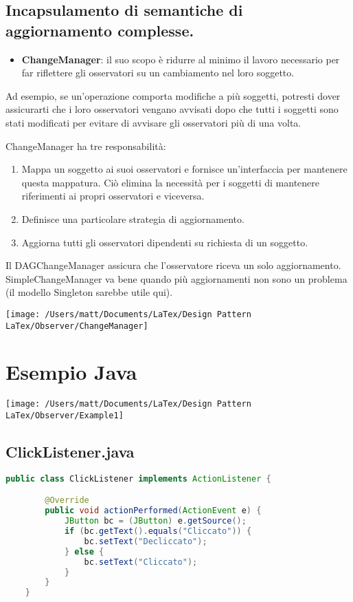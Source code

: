 \subsection{Incapsulamento di semantiche di aggiornamento complesse.}

\begin{itemize}
    \item \textbf{ChangeManager}: il suo scopo è ridurre al minimo il lavoro necessario per far riflettere gli osservatori su un cambiamento nel loro soggetto.
\end{itemize}

Ad esempio, se un'operazione comporta modifiche a più soggetti, potresti dover assicurarti che i loro osservatori vengano avvisati dopo che tutti i soggetti sono stati modificati per evitare di avvisare gli osservatori più di una volta.

ChangeManager ha tre responsabilità:

    \begin{enumerate}
        \item Mappa un soggetto ai suoi osservatori e fornisce un'interfaccia per mantenere questa mappatura. Ciò elimina la necessità per i soggetti di mantenere riferimenti ai propri osservatori e viceversa.

        \item Definisce una particolare strategia di aggiornamento.

        \item Aggiorna tutti gli osservatori dipendenti su richiesta di un soggetto.
    \end{enumerate}

Il DAGChangeManager assicura che l'osservatore riceva un solo aggiornamento. SimpleChangeManager va bene quando più aggiornamenti non sono un problema (il modello Singleton sarebbe utile qui).

\texttt{[image: /Users/matt/Documents/LaTex/Design Pattern LaTex/Observer/ChangeManager]}


\section{Esempio Java}
\texttt{[image: /Users/matt/Documents/LaTex/Design Pattern LaTex/Observer/Example1]}

\subsection{ClickListener.java}
\begin{lstlisting}[language=java]
    public class ClickListener implements ActionListener {

        @Override
        public void actionPerformed(ActionEvent e) {
            JButton bc = (JButton) e.getSource();
            if (bc.getText().equals("Cliccato")) {
                bc.setText("Decliccato");
            } else {
                bc.setText("Cliccato");
            }
        }
    }
\end{lstlisting}


